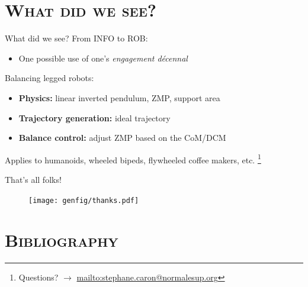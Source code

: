 \documentclass[9pt, aspectratio=43]{beamer}
\newcommand\blfootnote[1]{%
  \begingroup
  \renewcommand\thefootnote{}%
  \footnote{#1}%
  \addtocounter{footnote}{-1}%
  \endgroup
}
\begin{document}

\section*{\textsc{What did we see?}}


\begin{frame}{What did we see?}
    From INFO to ROB:
    \begin{itemize}
        \item One possible use of one's \emph{engagement d\'{e}cennal}
    \end{itemize}
    Balancing legged robots:
    \begin{itemize}
        \item \textbf{Physics:} linear inverted pendulum, ZMP, support area
        \item \textbf{Trajectory generation:} ideal trajectory
        \item \textbf{Balance control:} adjust ZMP based on the CoM/DCM
    \end{itemize}
    Applies to humanoids, wheeled bipeds, flywheeled coffee makers, etc.
    \blfootnote{
        Questions? $\to$ \url{mailto:stephane.caron@normalesup.org}
    }
\end{frame}

\begin{frame}{That's all folks!}
    \vspace{2em}
    \begin{figure}
        \centering
        \texttt{[image: genfig/thanks.pdf]}
    \end{figure}
\end{frame}


\section*{\textsc{Bibliography}}


\renewcommand*{\bibfont}{\footnotesize}
\end{document}
